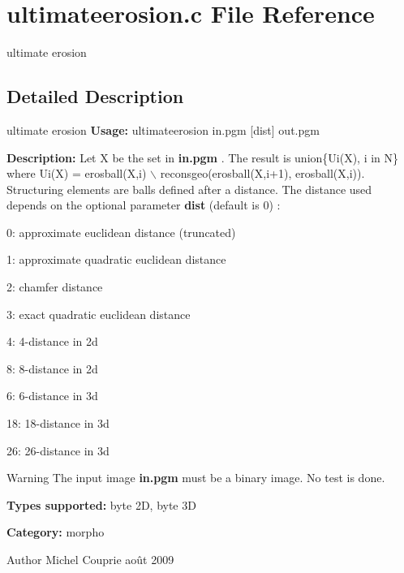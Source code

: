 \section{ultimateerosion.c File Reference}
\label{ultimateerosion_8c}


ultimate erosion  




\subsection{Detailed Description}
ultimate erosion {\bfseries Usage:} ultimateerosion in.pgm [dist] out.pgm

{\bfseries Description:} Let X be the set in {\bfseries in.pgm} . The result is union\{Ui(X), i in N\} where Ui(X) = erosball(X,i) $\backslash$ reconsgeo(erosball(X,i+1), erosball(X,i)). Structuring elements are balls defined after a distance. The distance used depends on the optional parameter {\bfseries dist} (default is 0) : \begin{DoxyItemize}
\item 0: approximate euclidean distance (truncated) \item 1: approximate quadratic euclidean distance \item 2: chamfer distance \item 3: exact quadratic euclidean distance \item 4: 4-\/distance in 2d \item 8: 8-\/distance in 2d \item 6: 6-\/distance in 3d \item 18: 18-\/distance in 3d \item 26: 26-\/distance in 3d\end{DoxyItemize}
\begin{DoxyWarning}{Warning}
The input image {\bfseries in.pgm} must be a binary image. No test is done.
\end{DoxyWarning}
{\bfseries Types supported:} byte 2D, byte 3D

{\bfseries Category:} morpho

\begin{DoxyAuthor}{Author}
Michel Couprie août 2009 
\end{DoxyAuthor}

